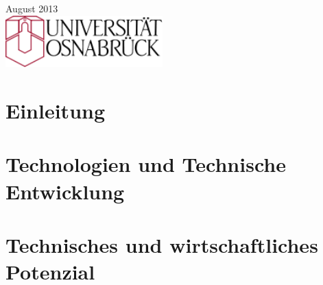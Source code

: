 \documentclass[12pt]{article}
\begin{document}
\begin{titlepage}


{\large August 2013}\\[3cm] %


\includegraphics[height=2cm]{unilogo.png}
 

\vfill %

\end{titlepage}

\tableofcontents
\newpage

\section{Einleitung}


\section{Technologien und Technische Entwicklung}


\section{Technisches und wirtschaftliches Potenzial}

\end{document}
